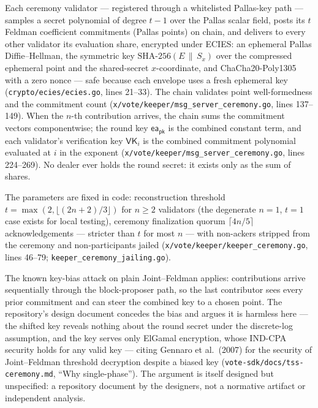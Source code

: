 \documentclass[11pt,a4paper]{article}
\theoremstyle{definition}
\begin{document}
Each ceremony validator --- registered through a whitelisted Pallas-key
path --- samples a secret polynomial of degree $t - 1$ over the Pallas
scalar field, posts its $t$ Feldman coefficient commitments (Pallas points)
on chain, and delivers to every other validator its evaluation share,
encrypted under ECIES: an ephemeral Pallas Diffie--Hellman, the symmetric
key $\mathrm{SHA\text{-}256}(E \,\|\, S_x)$ over the compressed ephemeral
point and the shared-secret $x$-coordinate, and ChaCha20-Poly1305 with a
zero nonce --- safe because each envelope uses a fresh ephemeral key
(\texttt{crypto/ecies/ecies.go}, lines 21--33). The chain validates point
well-formedness and the commitment count
(\texttt{x/vote/keeper/msg\_server\_ceremony.go}, lines 137--149). When the
$n$-th contribution arrives, the chain sums the commitment vectors
componentwise; the round key $\mathsf{ea_{pk}}$ is the combined constant
term, and each validator's verification key $\mathsf{VK}_i$ is the combined
commitment polynomial evaluated at $i$ in the exponent
(\texttt{x/vote/keeper/msg\_server\_ceremony.go}, lines 224--269). No dealer
ever holds the round secret: it exists only as the sum of shares.

The parameters are fixed in code: reconstruction threshold
$t = \max(2, \lfloor (2n+2)/3 \rfloor)$ for $n \geq 2$ validators (the
degenerate $n = 1$, $t = 1$ case exists for local testing), ceremony
finalization quorum $\lceil 4n/5 \rceil$ acknowledgements --- stricter than
$t$ for most $n$ --- with non-ackers stripped from the ceremony and
non-participants jailed (\texttt{x/vote/keeper/keeper\_ceremony.go}, lines
46--79; \texttt{keeper\_ceremony\_jailing.go}).

The known key-bias attack on plain Joint--Feldman applies: contributions
arrive sequentially through the block-proposer path, so the last
contributor sees every prior commitment and can steer the combined key to
a chosen point. The repository's design document concedes the bias and
argues it is harmless here --- the shifted key reveals nothing about the
round secret under the discrete-log assumption, and the key serves only
ElGamal encryption, whose IND-CPA security holds for any valid key ---
citing Gennaro et al.\ (2007) for the security of Joint--Feldman threshold
decryption despite a biased key (\texttt{vote-sdk/docs/tss-ceremony.md},
``Why single-phase''). The argument is itself designed but unspecified: a
repository document by the designers, not a normative artifact or
independent analysis.
\end{document}
